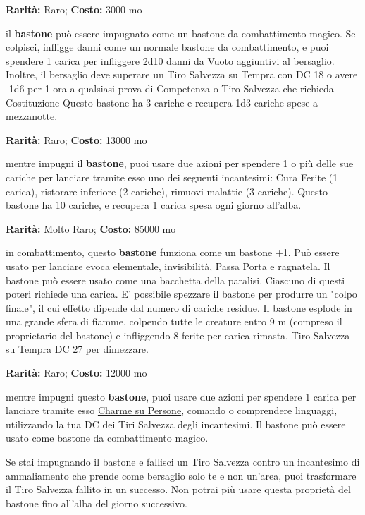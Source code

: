 \begin{multicols}{2}

\textbf{Rarità:} Raro; \textbf{Costo:} 3000 mo

il \textbf{bastone} può essere impugnato come un bastone da combattimento magico. Se colpisci, infligge danni come un normale bastone da combattimento, e puoi spendere 1 carica per infliggere 2d10 danni da Vuoto aggiuntivi al bersaglio. Inoltre, il bersaglio deve superare un Tiro Salvezza su Tempra con DC 18 o avere -1d6 per 1 ora a qualsiasi prova di Competenza o Tiro Salvezza che richieda Costituzione Questo bastone ha 3 cariche e recupera 1d3 cariche spese a mezzanotte.


\textbf{Rarità:} Raro; \textbf{Costo:} 13000 mo

mentre impugni il \textbf{bastone}, puoi usare due azioni per spendere 1 o più delle sue cariche per lanciare tramite esso uno dei seguenti incantesimi: Cura Ferite (1 carica), ristorare inferiore (2 cariche), rimuovi malattie (3 cariche). Questo bastone ha 10 cariche, e recupera 1 carica spesa ogni giorno all'alba.


\textbf{Rarità:} Molto Raro; \textbf{Costo:} 85000 mo

in combattimento, questo \textbf{bastone} funziona come un bastone +1. Può essere usato per lanciare evoca elementale, invisibilità, Passa Porta e ragnatela. Il bastone può essere usato come una bacchetta della paralisi. Ciascuno di questi poteri richiede una carica. E' possibile spezzare il bastone per produrre un "colpo finale", il cui effetto dipende dal numero di cariche residue. Il bastone esplode in una grande sfera di fiamme, colpendo tutte le creature entro 9 m (compreso il proprietario del bastone) e infliggendo 8 ferite per carica rimasta, Tiro Salvezza su Tempra DC 27 per dimezzare.


\textbf{Rarità:} Raro; \textbf{Costo:} 12000 mo

mentre impugni questo \textbf{bastone}, puoi usare due azioni per spendere 1 carica per lanciare tramite esso \hyperlink{Charme su Persone}{Charme su Persone}, comando o comprendere linguaggi, utilizzando la tua DC dei Tiri Salvezza degli incantesimi. Il bastone può essere usato come bastone da combattimento magico.

Se stai impugnando il bastone e fallisci un Tiro Salvezza contro un incantesimo di ammaliamento che prende come bersaglio solo te e non un'area, puoi trasformare il Tiro Salvezza fallito in un successo. Non potrai più usare questa proprietà del bastone fino all'alba del giorno successivo.


\end{multicols}
